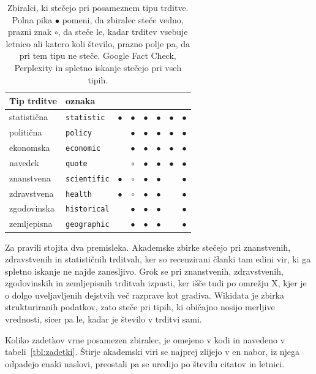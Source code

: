 \documentclass[a4paper, 12pt]{book}
\newcommand{\rot}[1]{\rotatebox{90}{\small #1}} %
\begin{document}
\begin{table}[H]
\centering
\small
{}
\begin{tabular}{@{}llcccccc@{}}
\toprule
Tip trditve & oznaka & \rot{akademske zbirke} & \rot{Wikidata} &
\rot{Google Fact Check} & \rot{Perplexity} & \rot{Grok} & \rot{spletno iskanje} \\
\midrule
statistična & \texttt{statistic} & $\bullet$ & $\bullet$ & $\bullet$ & $\bullet$ & $\bullet$ & $\bullet$ \\
politična & \texttt{policy} &  & $\bullet$ & $\bullet$ & $\bullet$ & $\bullet$ & $\bullet$ \\
ekonomska & \texttt{economic} &  & $\bullet$ & $\bullet$ & $\bullet$ & $\bullet$ & $\bullet$ \\
navedek & \texttt{quote} &  & $\circ$ & $\bullet$ & $\bullet$ & $\bullet$ & $\bullet$ \\
znanstvena & \texttt{scientific} & $\bullet$ & $\circ$ & $\bullet$ & $\bullet$ &  & $\bullet$ \\
zdravstvena & \texttt{health} & $\bullet$ & $\circ$ & $\bullet$ & $\bullet$ &  & $\bullet$ \\
zgodovinska & \texttt{historical} &  & $\bullet$ & $\bullet$ & $\bullet$ &  & $\bullet$ \\
zemljepisna & \texttt{geographic} &  & $\bullet$ & $\bullet$ & $\bullet$ &  & $\bullet$ \\
\bottomrule
\end{tabular}
\caption{Zbiralci, ki stečejo pri posameznem tipu trditve. Polna pika
$\bullet$ pomeni, da zbiralec steče vedno, prazni znak $\circ$, da steče le,
kadar trditev vsebuje letnico ali katero koli število, prazno polje pa, da pri
tem tipu ne steče. Google Fact Check, Perplexity in spletno iskanje stečejo pri
vseh tipih.}
\label{tbl:usmerjanje}
\end{table}

Za pravili stojita dva premisleka. Akademske zbirke stečejo pri znanstvenih,
zdravstvenih in statističnih trditvah, ker so recenzirani članki tam edini vir,
ki ga spletno iskanje ne najde zanesljivo. Grok se pri znanstvenih,
zdravstvenih, zgodovinskih in zemljepisnih trditvah izpusti, ker išče tudi po
omrežju X, kjer je o dolgo uveljavljenih dejstvih več razprave kot gradiva.
Wikidata je zbirka strukturiranih podatkov, zato steče pri tipih, ki običajno
nosijo merljive vrednosti, sicer pa le, kadar je število v trditvi sami.

Koliko zadetkov vrne posamezen zbiralec, je omejeno v kodi in navedeno v
tabeli~\ref{tbl:zadetki}. Štirje akademski viri se najprej zlijejo v en nabor,
iz njega odpadejo enaki naslovi, preostali pa se uredijo po številu citatov in
letnici.
\end{document}

